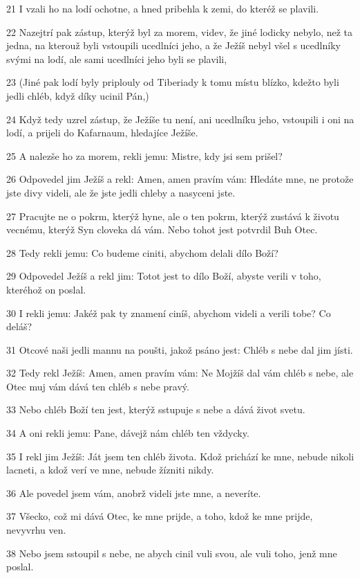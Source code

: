 \par 21 I vzali ho na lodí ochotne, a hned pribehla k zemi, do kteréž se plavili.
\par 22 Nazejtrí pak zástup, kterýž byl za morem, videv, že jiné lodicky nebylo, než ta jedna, na kterouž byli vstoupili ucedlníci jeho, a že Ježíš nebyl všel s ucedlníky svými na lodí, ale sami ucedlníci jeho byli se plavili,
\par 23 (Jiné pak lodí byly priplouly od Tiberiady k tomu místu blízko, kdežto byli jedli chléb, když díky ucinil Pán,)
\par 24 Když tedy uzrel zástup, že Ježíše tu není, ani ucedlníku jeho, vstoupili i oni na lodí, a prijeli do Kafarnaum, hledajíce Ježíše.
\par 25 A nalezše ho za morem, rekli jemu: Mistre, kdy jsi sem prišel?
\par 26 Odpovedel jim Ježíš a rekl: Amen, amen pravím vám: Hledáte mne, ne protože jste divy videli, ale že jste jedli chleby a nasyceni jste.
\par 27 Pracujte ne o pokrm, kterýž hyne, ale o ten pokrm, kterýž zustává k životu vecnému, kterýž Syn cloveka dá vám. Nebo tohot jest potvrdil Buh Otec.
\par 28 Tedy rekli jemu: Co budeme ciniti, abychom delali dílo Boží?
\par 29 Odpovedel Ježíš a rekl jim: Totot jest to dílo Boží, abyste verili v toho, kteréhož on poslal.
\par 30 I rekli jemu: Jakéž pak ty znamení ciníš, abychom videli a verili tobe? Co deláš?
\par 31 Otcové naši jedli mannu na poušti, jakož psáno jest: Chléb s nebe dal jim jísti.
\par 32 Tedy rekl Ježíš: Amen, amen pravím vám: Ne Mojžíš dal vám chléb s nebe, ale Otec muj vám dává ten chléb s nebe pravý.
\par 33 Nebo chléb Boží ten jest, kterýž sstupuje s nebe a dává život svetu.
\par 34 A oni rekli jemu: Pane, dávejž nám chléb ten vždycky.
\par 35 I rekl jim Ježíš: Ját jsem ten chléb života. Kdož prichází ke mne, nebude nikoli lacneti, a kdož verí ve mne, nebude žízniti nikdy.
\par 36 Ale povedel jsem vám, anobrž videli jste mne, a neveríte.
\par 37 Všecko, což mi dává Otec, ke mne prijde, a toho, kdož ke mne prijde, nevyvrhu ven.
\par 38 Nebo jsem sstoupil s nebe, ne abych cinil vuli svou, ale vuli toho, jenž mne poslal.
